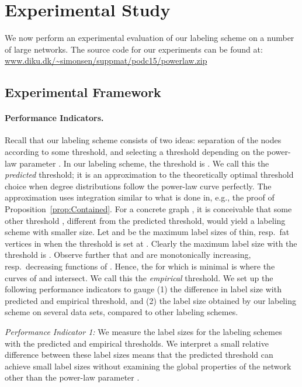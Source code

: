 \documentclass{article}
\theoremstyle{remark}
\begin{document}
\section{Experimental Study}

We now  perform an experimental evaluation of our labeling scheme on a number of large networks.
The source code for our experiments can be found at: \url{www.diku.dk/\~simonsen/suppmat/podc15/powerlaw.zip}

\subsection{Experimental Framework}\label{Sec:Experimental}
\paragraph{Performance Indicators.}
Recall that our labeling scheme consists of two ideas: separation of the nodes according to some threshold, and selecting a threshold depending on the power-law parameter .
In our labeling scheme, the threshold  is . We call this the \emph{predicted} threshold; it is an approximation to the theoretically optimal threshold choice when degree distributions follow the power-law curve  perfectly. The approximation uses integration similar to what is done in, e.g., the proof of Proposition~\ref{prop:Contained}.
For a concrete
graph , it is conceivable that some other threshold , different from the predicted threshold, would yield a labeling scheme with smaller size. 
Let  and  be the maximum label sizes of thin, resp.\ fat vertices in  when the threshold is set at . Clearly
the maximum label size with the threshold  is . Observe further
that  and  are monotonically increasing, resp.\ decreasing functions of . Hence,
the  for which  is minimal is where the curves of  and  intersect. We call this  the \emph{empirical} threshold.
We set up the following performance indicators to gauge (1) the difference in label size with predicted and empirical threshold, and (2) the label size obtained by our labeling scheme on several data sets, compared to other labeling schemes.

\emph{Performance Indicator 1:} We measure the label sizes for the labeling schemes with the predicted and empirical thresholds. We interpret a small relative difference between these label sizes means that the predicted threshold can achieve small label sizes without examining the global properties of the network other than the power-law parameter . 
 
\end{document}
